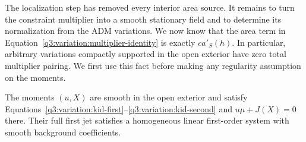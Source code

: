 The localization step has removed every interior area source.
It remains to turn the constraint multiplier into a smooth stationary
field and to determine its normalization from the ADM variations.
We now know that the area term in
Equation~\eqref{q3:variation:multiplier-identity} is exactly $c a'_S(h)$.
In particular, arbitrary variations compactly supported in the open
exterior have zero total multiplier pairing.  We first use this fact
before making any regularity assumption on the moments.

\begin{lemma}
\label{q3:variation:interior-equations}
The moments $(u,X)$ are smooth in the open exterior and satisfy
Equations~\eqref{q3:variation:kid-first}--\eqref{q3:variation:kid-second}
and $u\mu+J(X)=0$ there.  Their full first jet satisfies a homogeneous
linear first-order system with smooth background coefficients.
\end{lemma}

